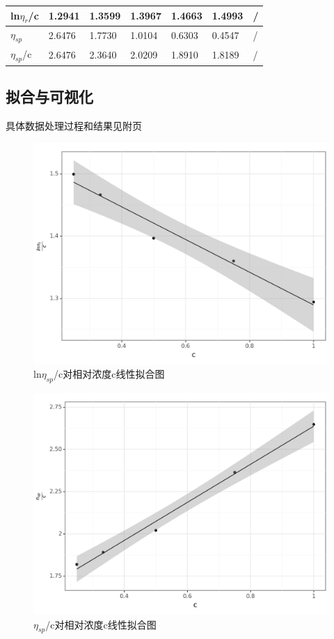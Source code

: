 \documentclass[12pt,hyperref,a4paper,UTF8]{ctexart}
\begin{document}
\begin{table}[htp]
\begin{tabular}{|ll|l|l|l|l|l|l|}
\multicolumn{2}{|l|}{ln$\eta _r$/c}                                                                                 & 1.2941 & 1.3599 & 1.3967 & 1.4663 & 1.4993 & /     \\ \hline
\multicolumn{2}{|l|}{$\eta _{sp}$}                                                                                    & 2.6476 & 1.7730 & 1.0104 & 0.6303 & 0.4547 & /     \\ \hline
\multicolumn{2}{|l|}{$\eta _{sp}$/c}                                                                                  & 2.6476 & 2.3640 & 2.0209 & 1.8910 & 1.8189 & /     \\ \hline
\end{tabular}
\end{table}



\subsection{拟合与可视化}
具体数据处理过程和结果见附页

\begin{figure}[H]
	\centering
	\includegraphics[width=0.7\linewidth]{fig1.png}
	\caption{ln$\eta _{sp}$/c对相对浓度c线性拟合图}
	\label{fig:enter-label}
\end{figure}
\begin{figure}[H]
	\centering
	\includegraphics[width=0.7\linewidth]{fig2.png}
	\caption{$\eta _{sp}$/c对相对浓度c线性拟合图}
	\label{fig:enter-label}
\end{figure}
\end{document}
